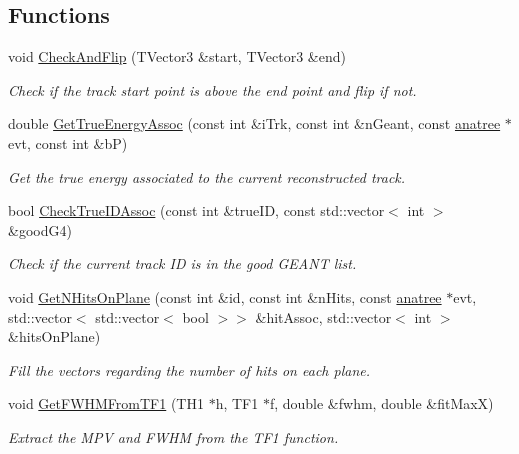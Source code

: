 \subsection*{Functions}
\begin{DoxyCompactItemize}
\item 
void \hyperlink{namespacecalib_a856373d78738b9950df22f0d9fbe2d1b}{Check\-And\-Flip} (T\-Vector3 \&start, T\-Vector3 \&end)
\begin{DoxyCompactList}\small\item\em Check if the track start point is above the end point and flip if not. \end{DoxyCompactList}\item 
double \hyperlink{namespacecalib_a3e74469ecf9a8f68f8b3b29c5bf4d435}{Get\-True\-Energy\-Assoc} (const int \&i\-Trk, const int \&n\-Geant, const \hyperlink{classanatree}{anatree} $\ast$evt, const int \&b\-P)
\begin{DoxyCompactList}\small\item\em Get the true energy associated to the current reconstructed track. \end{DoxyCompactList}\item 
bool \hyperlink{namespacecalib_a7f422a36cfbc70f2c1613958be850d6b}{Check\-True\-I\-D\-Assoc} (const int \&true\-I\-D, const std\-::vector$<$ int $>$ \&good\-G4)
\begin{DoxyCompactList}\small\item\em Check if the current track I\-D is in the good G\-E\-A\-N\-T list. \end{DoxyCompactList}\item 
void \hyperlink{namespacecalib_a3fbdf602928f87de620d008cf655ee7c}{Get\-N\-Hits\-On\-Plane} (const int \&id, const int \&n\-Hits, const \hyperlink{classanatree}{anatree} $\ast$evt, std\-::vector$<$ std\-::vector$<$ bool $>$$>$ \&hit\-Assoc, std\-::vector$<$ int $>$ \&hits\-On\-Plane)
\begin{DoxyCompactList}\small\item\em Fill the vectors regarding the number of hits on each plane. \end{DoxyCompactList}\item 
void \hyperlink{namespacecalib_a07522eee19c83421170df230b6244404}{Get\-F\-W\-H\-M\-From\-T\-F1} (T\-H1 $\ast$h, T\-F1 $\ast$f, double \&fwhm, double \&fit\-Max\-X)
\begin{DoxyCompactList}\small\item\em Extract the M\-P\-V and F\-W\-H\-M from the T\-F1 function. \end{DoxyCompactList}\item 
$$
\end{DoxyCompactItemize}
